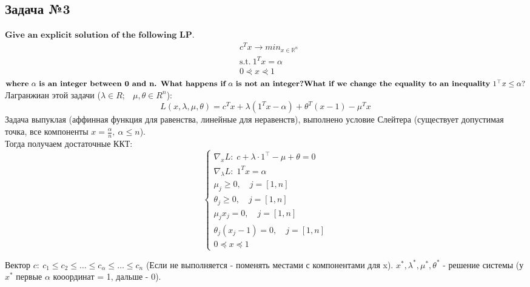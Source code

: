 \documentclass[12pt,letterpaper]{article}
\begin{document}
\subsection*{Задача №3}
$\textbf{Give an explicit solution of the following LP.}$
$$ 
\begin{aligned}
&c^Tx\rightarrow min_{x\in \mathbb{R}^n}\\ 
&\text{s.t.}\ 1^Tx=\alpha\\
&0\curlyeqprec x\curlyeqprec1
\end{aligned}
$$
$\textbf{where}\ \alpha\ \textbf{is an integer between 0 and n. What happens if}\ \alpha\ \textbf{is not an integer?} \\
\textbf{What if we change the equality to an inequality}\ 1^\top x \leq \alpha?$\\

Лагранжиан этой задачи ($ \lambda \in R; \; \ \; \mu, \theta \in R^n $): 
$$
L(x, \lambda, \mu, \theta)=c^{T} x+\lambda\left(1^{T} x-\alpha\right)+\theta^{T}(x-1)-\mu^{T} x
$$
Задача выпуклая (аффинная функция для равенства, линейные для неравенств), выполнено условие Слейтера (существует допустимая точка, все компоненты $x=\frac{\alpha}{n},\ \alpha \leq n$).\\
Тогда получаем достаточные ККТ:
$$
\left\{\begin{array}{l}
\nabla_x L: \; c+\lambda \cdot 1^{\top}-\mu + \theta=0 \\
\nabla_{\lambda} L: \; 1^{T} x= \alpha \\
\mu_{j} \geqslant 0 , \quad j=[1, n] \\
\theta_{j} \geqslant 0 , \quad j=[1, n] \\
\mu_{j} x_{j}=0, \quad j=[1, n] \\
\theta_{j} ( x_{j} - 1)=0, \quad j=[1, n] \\
0 \preceq  x \preceq 1
\end{array}\right.
$$

Вектор $ c:\ c_{1} \leqslant c_{2} \leqslant \ldots \leqslant c_{\alpha} \leqslant \ldots \leqslant c_{n}$ (Если не выполняется - поменять местами с компонентами для x). $ x^*, \lambda^*, \mu^*, \theta^* $ - решение системы (у $ x^* $ первые $\alpha$ кооординат = 1, дальше - 0).\\
\end{document}
